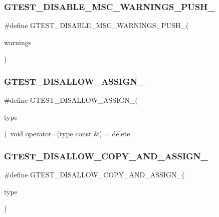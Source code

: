\subsubsection{\texorpdfstring{GTEST\_DISABLE\_MSC\_WARNINGS\_PUSH\_}{GTEST\_DISABLE\_MSC\_WARNINGS\_PUSH\_}}
{\footnotesize\ttfamily \#define G\+T\+E\+S\+T\+\_\+\+D\+I\+S\+A\+B\+L\+E\+\_\+\+M\+S\+C\+\_\+\+W\+A\+R\+N\+I\+N\+G\+S\+\_\+\+P\+U\+S\+H\+\_\+(\begin{DoxyParamCaption}\item[{}]{warnings }\end{DoxyParamCaption})}

\mbox{\label{_obj__test_2lib_2googletest-master_2googletest_2include_2gtest_2internal_2gtest-port_8h_ac593b50ce24257d5b6aa84845c344c9e}} 
\subsubsection{\texorpdfstring{GTEST\_DISALLOW\_ASSIGN\_}{GTEST\_DISALLOW\_ASSIGN\_}}
{\footnotesize\ttfamily \#define G\+T\+E\+S\+T\+\_\+\+D\+I\+S\+A\+L\+L\+O\+W\+\_\+\+A\+S\+S\+I\+G\+N\+\_\+(\begin{DoxyParamCaption}\item[{}]{type }\end{DoxyParamCaption})~void operator=(type const \&) = delete}

\mbox{\label{_obj__test_2lib_2googletest-master_2googletest_2include_2gtest_2internal_2gtest-port_8h_aed8c1888c32b588b0681e88b95031e29}} 
\subsubsection{\texorpdfstring{GTEST\_DISALLOW\_COPY\_AND\_ASSIGN\_}{GTEST\_DISALLOW\_COPY\_AND\_ASSIGN\_}}
{\footnotesize\ttfamily \#define G\+T\+E\+S\+T\+\_\+\+D\+I\+S\+A\+L\+L\+O\+W\+\_\+\+C\+O\+P\+Y\+\_\+\+A\+N\+D\+\_\+\+A\+S\+S\+I\+G\+N\+\_\+(\begin{DoxyParamCaption}\item[{}]{type }\end{DoxyParamCaption})}

